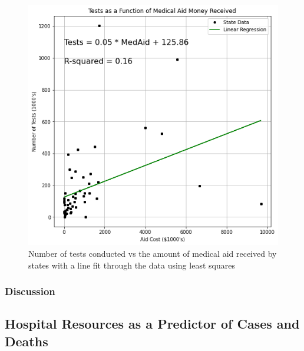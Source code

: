 \documentclass[11pt]{article}
\begin{document}
\FloatBarrier
\begin{figure}[h]
    \centering
    \includegraphics[scale=0.5]{diagrams/analysis/medaid_corr_outliers.png}
    \caption{Number of tests conducted vs the amount of medical aid received by states with a line fit through the data using least squares}
    \label{fig:test_cost_fit}
\end{figure}
\FloatBarrier


\subsubsection{Discussion}

\pagebreak

\subsection{Hospital Resources as a Predictor of Cases and Deaths}
\end{document}
